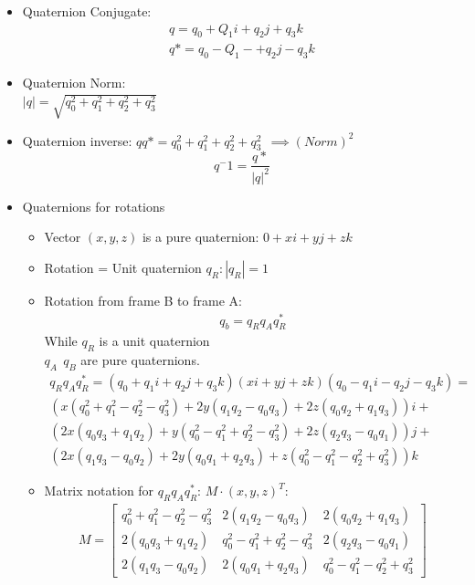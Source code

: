 \documentclass{article}
\begin{document}
\begin{itemize}
    \item Quaternion Conjugate: \\
    \begin{gather*}
        q=q_0+Q_1i+q_2j+q_3k\\
        q*=q_0-Q_1-+q_2j-q_3k
    \end{gather*}
    \item Quaternion Norm: \\
    $ \left|q\right|=\sqrt{q^2_0+q^2_1+q^2_2+q^2_3} $
    \item Quaternion inverse:
    $ qq* = q^2_0+q^2_1+q^2_2+q^2_3 \:\: \implies (Norm)^2$
    $$q^-1 = \frac{q*}{|q|^2} $$
    \item Quaternions for rotations
    \begin{itemize}
        \item Vector $(x,y,z)$ is a pure quaternion: $0+xi+yj+zk $
        \item Rotation = Unit quaternion $q_R:|q_R|=1$
        \item Rotation from frame B to frame A:
        \begin{gather*}
         q_b = q_Rq_Aq^*_R 
        \end{gather*}
        While $q_R$ is a unit quaternion\\
        $q_A \:\: q_B$ are pure quaternions.
        \begin{gather*}
            q_Rq_Aq^*_R = (q_0 + q_1i + q_2j + q_3k)(xi + yj + zk)(q_0 - q_1i - q_2j - q_3k) = \\
            (x(q^2_0 + q^2_1 - q^2_2 - q^2_3) + 2y(q_1q_2-q_0q_3)+2z(q_0q_2+q_1q_3))i + \\
            (2x(q_0q_3 + q_1q_2)+y(q^2_0 - q^2_1 + q^2_2 - q^2_3) + 2z(q_2q_3-q_0q_1))j + \\
            (2x(q_1q_3-q_0q_2)+2y(q_0q_1+q_2q_3)+z(q^2_0 - q^2_1 - q^2_2 + q^2_3))k 
        \end{gather*}
        \item Matrix notation for $q_Rq_Aq^*_R$: $M\cdot(x,y,z)^T$:
        \begin{gather*}
            M = 
          \begin{bmatrix}
            q^2_0 + q^2_1 - q^2_2 - q^2_3 & 2(q_1q_2-q_0q_3) & 2(q_0q_2+q_1q_3) \\
            2(q_0q_3 + q_1q_2) & q^2_0 - q^2_1 + q^2_2 - q^2_3 & 2(q_2q_3-q_0q_1)  \\
            2(q_1q_3-q_0q_2) & 2(q_0q_1+q_2q_3) & q^2_0 - q^2_1 - q^2_2 + q^2_3
          \end{bmatrix}

\end{gather*}
\end{itemize}
\end{itemize}
\end{document}
